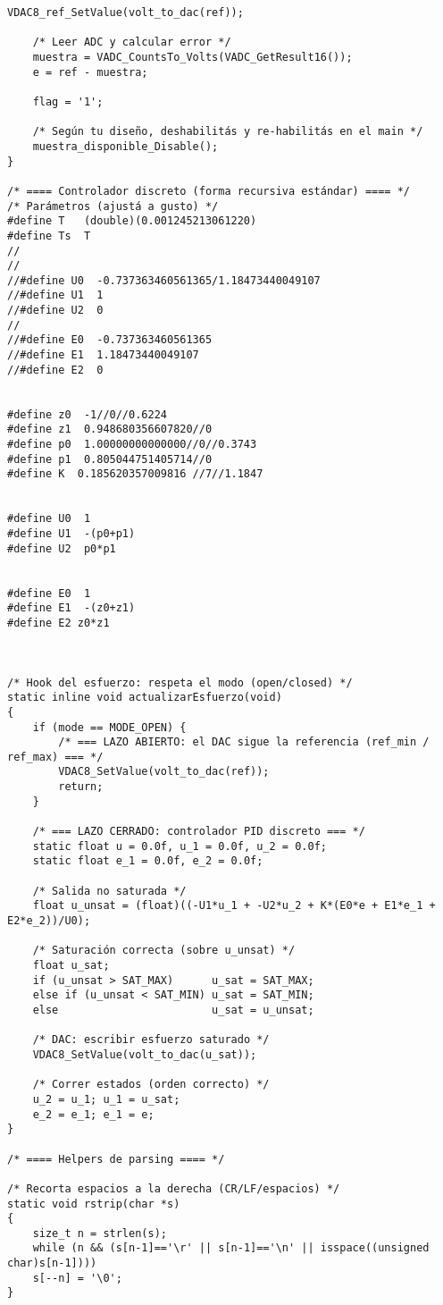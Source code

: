 \begin{lstlisting}[style=cstyle,
	caption={Código desarrollado para la implementación de los compensadores con el PSoC en lenguaje C.},
	label={c:psoc}
	]
	VDAC8_ref_SetValue(volt_to_dac(ref));
	
	/* Leer ADC y calcular error */
	muestra = VADC_CountsTo_Volts(VADC_GetResult16());
	e = ref - muestra;
	
	flag = '1';
	
	/* Según tu diseño, deshabilitás y re-habilitás en el main */
	muestra_disponible_Disable();
}

/* ==== Controlador discreto (forma recursiva estándar) ==== */
/* Parámetros (ajustá a gusto) */
#define T   (double)(0.001245213061220)
#define Ts  T
//
//
//#define U0  -0.737363460561365/1.18473440049107
//#define U1  1
//#define U2  0
//
//#define E0  -0.737363460561365
//#define E1  1.18473440049107
//#define E2  0


#define z0  -1//0//0.6224
#define z1  0.948680356607820//0
#define p0  1.00000000000000//0//0.3743
#define p1  0.805044751405714//0
#define K  0.185620357009816 //7//1.1847


#define U0  1
#define U1  -(p0+p1)
#define U2  p0*p1


#define E0  1
#define E1  -(z0+z1)
#define E2 z0*z1



/* Hook del esfuerzo: respeta el modo (open/closed) */
static inline void actualizarEsfuerzo(void)
{
	if (mode == MODE_OPEN) {
		/* === LAZO ABIERTO: el DAC sigue la referencia (ref_min / ref_max) === */
		VDAC8_SetValue(volt_to_dac(ref));
		return;
	}
	
	/* === LAZO CERRADO: controlador PID discreto === */
	static float u = 0.0f, u_1 = 0.0f, u_2 = 0.0f;
	static float e_1 = 0.0f, e_2 = 0.0f;
	
	/* Salida no saturada */
	float u_unsat = (float)((-U1*u_1 + -U2*u_2 + K*(E0*e + E1*e_1 + E2*e_2))/U0);
	
	/* Saturación correcta (sobre u_unsat) */
	float u_sat;
	if (u_unsat > SAT_MAX)      u_sat = SAT_MAX;
	else if (u_unsat < SAT_MIN) u_sat = SAT_MIN;
	else                        u_sat = u_unsat;
	
	/* DAC: escribir esfuerzo saturado */
	VDAC8_SetValue(volt_to_dac(u_sat));
	
	/* Correr estados (orden correcto) */
	u_2 = u_1; u_1 = u_sat;
	e_2 = e_1; e_1 = e;
}

/* ==== Helpers de parsing ==== */

/* Recorta espacios a la derecha (CR/LF/espacios) */
static void rstrip(char *s)
{
	size_t n = strlen(s);
	while (n && (s[n-1]=='\r' || s[n-1]=='\n' || isspace((unsigned char)s[n-1])))
	s[--n] = '\0';
}


\end{lstlisting}
